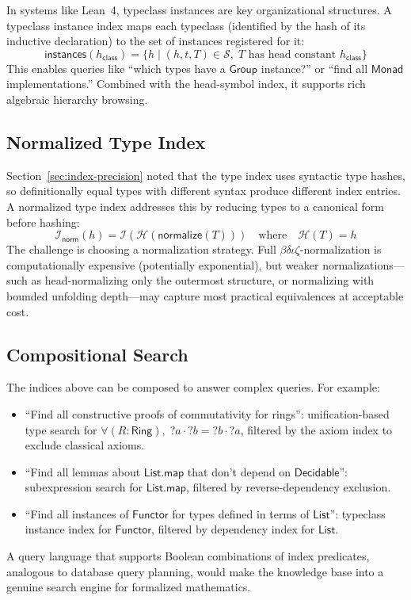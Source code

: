 \documentclass[11pt]{article}
\theoremstyle{definition}
\theoremstyle{plain}
\theoremstyle{remark}
\newcommand{\hash}{\mathcal{H}}
\newcommand{\hashset}{\mathcal{S}}
\newcommand{\typeindex}{\mathcal{I}}
\begin{document}
In systems like Lean~4, typeclass instances are key organizational structures.
A typeclass instance index maps each typeclass (identified by the hash of its
inductive declaration) to the set of instances registered for it:
\[
  \textsf{instances}(h_{\textsf{class}}) = \{ h \mid (h, t, T) \in \hashset,\;
  T \text{ has head constant } h_{\textsf{class}} \}
\]
This enables queries like ``which types have a $\textsf{Group}$ instance?'' or
``find all $\textsf{Monad}$ implementations.''
Combined with the head-symbol index, it supports rich algebraic hierarchy browsing.

\subsection{Normalized Type Index}
\label{sec:norm-index}

Section~\ref{sec:index-precision} noted that the type index uses syntactic type hashes,
so definitionally equal types with different syntax produce different index entries.
A normalized type index addresses this by reducing types to a canonical form before hashing:
\[
  \typeindex_{\textsf{norm}}(h) = \typeindex(\hash(\textsf{normalize}(T)))
  \quad\text{where}\quad \hash(T) = h
\]
The challenge is choosing a normalization strategy.
Full $\beta\delta\iota\zeta$-normalization is computationally expensive (potentially
exponential), but weaker normalizations---such as head-normalizing only the outermost
structure, or normalizing with bounded unfolding depth---may capture most practical
equivalences at acceptable cost.

\subsection{Compositional Search}
\label{sec:compositional}

The indices above can be composed to answer complex queries.
For example:
\begin{itemize}[nosep]
  \item ``Find all constructive proofs of commutativity for rings'':
    unification-based type search for $\forall (R : \textsf{Ring}),\; ?a \cdot ?b = ?b \cdot ?a$,
    filtered by the axiom index to exclude classical axioms.
  \item ``Find all lemmas about $\textsf{List.map}$ that don't depend on $\textsf{Decidable}$'':
    subexpression search for $\textsf{List.map}$, filtered by reverse-dependency exclusion.
  \item ``Find all instances of $\textsf{Functor}$ for types defined in terms of $\textsf{List}$'':
    typeclass instance index for $\textsf{Functor}$, filtered by dependency index for $\textsf{List}$.
\end{itemize}
A query language that supports Boolean combinations of index predicates, analogous to
database query planning, would make the knowledge base into a genuine search engine
for formalized mathematics.
\end{document}

